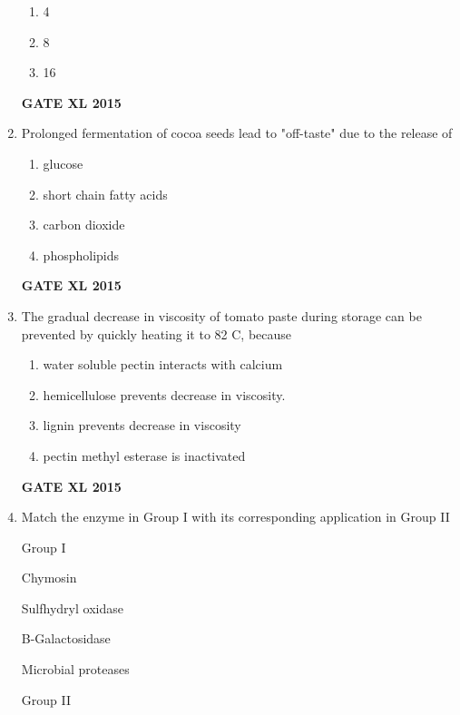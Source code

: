 \documentclass[journal,12pt,onecolumn]{IEEEtran}
\begin{document}
\begin{enumerate}
\begin{enumerate}
	    \item 4
	    \item 8
            \item 16
    \end{enumerate}
\begin{flushright}\textbf{GATE XL 2015}\end{flushright}
\item Prolonged fermentation of cocoa seeds lead to "off-taste" due to the release of
    \begin{enumerate}
            \item glucose
	    \item short chain fatty acids 
	    \item  carbon dioxide
            \item phospholipids
    \end{enumerate}
\begin{flushright}\textbf{GATE XL 2015}\end{flushright}
\item The gradual decrease in viscosity of tomato paste during storage can be prevented by quickly heating it to 82 \degree C, because
    \begin{enumerate}
            \item water soluble pectin interacts with calcium
	    \item hemicellulose prevents decrease in viscosity.
	    \item lignin prevents decrease in viscosity
            \item pectin methyl esterase is inactivated
    \end{enumerate}
\begin{flushright}\textbf{GATE XL 2015}\end{flushright}
\item {Match the enzyme in Group I with its corresponding application in Group II}

	\begin{minipage}{0.5\textwidth}\begin{flushleft}
Group I

 Chymosin

 Sulfhydryl oxidase

 B-Galactosidase

 Microbial proteases
	\end{flushleft}
	\end{minipage}
	\begin{minipage}{0.5\textwidth}\begin{flushleft}
Group II


\end{flushleft}
\end{minipage}
\end{enumerate}
\end{document}
